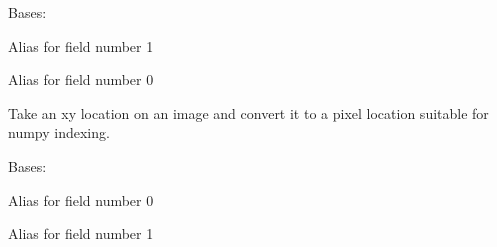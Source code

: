 \documentclass[letterpaper,10pt,english]{sphinxmanual}
\begin{document}

\begin{fulllineitems}
\label{\detokenize{xanespy:xanespy.utilities.shape}}
Bases: 

\begin{fulllineitems}
\label{\detokenize{xanespy:xanespy.utilities.shape.columns}}
Alias for field number 1

\end{fulllineitems}


\begin{fulllineitems}
\label{\detokenize{xanespy:xanespy.utilities.shape.rows}}
Alias for field number 0

\end{fulllineitems}


\end{fulllineitems}


\begin{fulllineitems}
\label{\detokenize{xanespy:xanespy.utilities.xy_to_pixel}}
Take an xy location on an image and convert it to a pixel location
suitable for numpy indexing.

\end{fulllineitems}


\begin{fulllineitems}
\label{\detokenize{xanespy:xanespy.utilities.xycoord}}
Bases: 

\begin{fulllineitems}
\label{\detokenize{xanespy:xanespy.utilities.xycoord.x}}
Alias for field number 0

\end{fulllineitems}


\begin{fulllineitems}
\label{\detokenize{xanespy:xanespy.utilities.xycoord.y}}
Alias for field number 1

\end{fulllineitems}


\end{fulllineitems}
\end{document}
